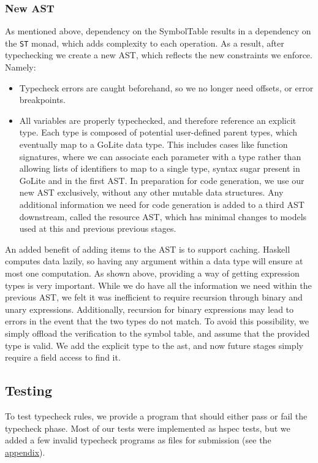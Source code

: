 \documentclass[11pt]{article}
\begin{document}
\subsubsection{New AST}
As mentioned above, dependency on the SymbolTable results in a
dependency on the \texttt{ST} monad, which adds complexity to each
operation.  As a result, after typechecking we create a new AST, which
reflects the new constraints we enforce.  Namely:
\begin{itemize}
\item Typecheck errors are caught beforehand, so we no longer need
  offsets, or error breakpoints.
\item All variables are properly typechecked, and therefore reference
  an explicit type. Each type is composed of potential user-defined
  parent types, which eventually map to a GoLite data type.  This
  includes cases like function signatures, where we can associate each
  parameter with a type rather than allowing lists of identifiers to
  map to a single type, syntax sugar present in GoLite and in the
  first AST.  In preparation for code generation, we use our new AST
  exclusively, without any other mutable data structures. Any
  additional information we need for code generation is added to a
  third AST downstream, called the resource AST, which has minimal
  changes to models used at this and previous previous stages.
\end{itemize}

An added benefit of adding items to the AST is to support caching.
Haskell computes data lazily, so having any argument within a data
type will ensure at most one computation.  As shown above, providing a
way of getting expression types is very important. While we do have
all the information we need within the previous AST, we felt it was
inefficient to require recursion through binary and unary expressions.
Additionally, recursion for binary expressions may lead to errors in
the event that the two types do not match. To avoid this possibility,
we simply offload the verification to the symbol table, and assume
that the provided type is valid.  We add the explicit type to the ast,
and now future stages simply require a field access to find it.

\subsection{Testing}

To test typecheck rules, we provide a program that should either pass
or fail the typecheck phase. Most of our tests were implemented as
hspec tests, but we added a few invalid typecheck programs as files
for submission (see the \hyperref[sec:atypecheck]{appendix}).
\end{document}
